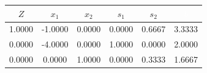 \begin{table}[H]
\centering
\begin{tabular}{|c|c|c|c|c|c|}
\hline
\cellcolor{red} $Z$ & \cellcolor{orange} $x_{1}$ & \cellcolor{orange} $x_{2}$ & \cellcolor{yellow} $s_{1}$ & \cellcolor{yellow} $s_{2}$ & \cellcolor{black} \textcolor{white}{$b$} \\ 
\hline
1.0000 & -1.0000 & 0.0000 & 0.0000 & 0.6667 & 3.3333 \\ 
\hline
0.0000 & -4.0000 & 0.0000 & 1.0000 & 0.0000 & 2.0000 \\ 
\hline
0.0000 & 0.0000 & 1.0000 & 0.0000 & 0.3333 & 1.6667 \\ 
\hline
\end{tabular}
\end{table}
